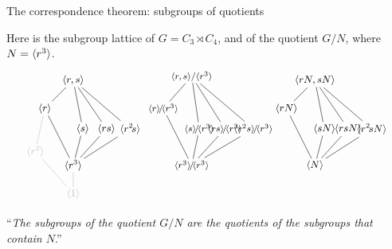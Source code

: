 \documentclass[8pt, handout]{beamer}
\begin{document}

\begin{frame}{The correspondence theorem: subgroups of quotients} \smallskip
  
  Here is the subgroup lattice of $G=C_3 \rtimes C_4$, and of the quotient
  $G/N$, where $N=\langle r^3\rangle$.
  \[
  \begin{tikzpicture}[scale=.6,auto]
    \begin{scope}[shift={(0,-0)},shorten >= -2pt, shorten <= -2pt]
      \tikzstyle{every node}=[font=\small]
      \node(G) at (0,6) {$\<r,s\>$};
      \node(b) at (-1.5,4.5) {$\<r\>$};
      \node(aa) at (0,1.5) {$\<r^3\>$};
      \node(bb) at (-2,2.25) {\color{faded}$\<r^2\>$};
      \node(a) at (.5,24/7) {$\<s\>$};
      \node(ab) at (1.75,24/7) { $\<rs\>$};
      \node(ba) at (3,24/7) {$\<r^2\!s\>$};
      \node(1) at (0,0) {\color{faded}$\<1\>$};
      \draw[faded](1)--(aa); \draw[faded](1)--(bb);
      \draw(b)--(aa); \draw[faded](b)--(bb);
      \draw(G)--(a); \draw(G)--(ab); \draw(G)--(ba); \draw(G)--(b);
      \draw(aa)--(a); \draw(aa)--(ab); \draw(aa)--(ba);
    \end{scope}
    \begin{scope}[shift={(12.75,-0)},shorten >= -2pt, shorten <= -2pt]
      \tikzstyle{every node}=[font=\small]
      \node(G) at (0,6) {$\<rN,sN\>$};
      \node(b) at (-1.5,4.5) {$\<rN\>$};
      \node(aa) at (0,1.5) {$\<N\>$};
      \node(a) at (.5,24/7) {$\<sN\>$};
      \node(ab) at (1.75,24/7) { $\<rsN\>$};
      \node(ba) at (3,24/7) {$\<r^2\!sN\>$};
      \draw(b)--(aa);
      \draw(G)--(a); \draw(G)--(ab); \draw(G)--(ba); \draw(G)--(b);
      \draw(aa)--(a); \draw(aa)--(ab); \draw(aa)--(ba);
    \end{scope}
    \begin{scope}[shift={(6.25,-0)},shorten >= -2pt, shorten <= -2pt]
      \tikzstyle{every node}=[font=\footnotesize]
      \node(G) at (0,6.2) {$\<r,s\>/\<r^3\>$};
      \node(b) at (-1.5,4.5) {$\<r\>\!/\!\<r^3\>$};
      \node(aa) at (0,1.5) {$\<r^3\>\!/\!\<r^3\>$};
      \node(a) at (.4,24/7) {$\<s\>\!/\!\<r^3\>$};
      \node(ab) at (1.75,24/7) { $\<rs\>\!/\!\<r^3\>$};
      \node(ba) at (3.25,24/7) {$\<r^2s\>\!/\!\<r^3\>$};
      \draw(b)--(aa); 
      \draw(G)--(a); \draw(G)--(ab); \draw(G)--(ba); \draw(G)--(b);
      \draw(aa)--(a); \draw(aa)--(ab); \draw(aa)--(ba);
    \end{scope}
  \end{tikzpicture}
  \]
  ``\emph{The subgroups of the
    quotient $G/N$ are the quotients of the subgroups that contain $N$}.''
    

\end{frame}
\end{document}
